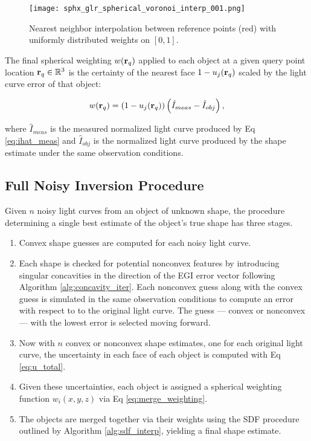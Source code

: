 \begin{figure}[!htb]
  \centering
  \texttt{[image: sphx\_glr\_spherical\_voronoi\_interp\_001.png]}
  \caption{Nearest neighbor interpolation between reference points (red) with uniformly distributed weights on $[0,1]$.}
  \label{fig:ball_tree_nn_interp}
\end{figure}

The final spherical weighting $w(\mathbf{r}_q)$ applied to each object at a given query point location $\mathbf{r}_q \in \mathbb{R}^3$ is the certainty of the nearest face $1-u_j(\mathbf{r}_q)$ scaled by the light curve error of that object:

\begin{equation} \label{eq:merge_weighting}
  w(\mathbf{r}_q) = \left( 1-u_j(\mathbf{r}_q) \right) \left( \hat{I}_{meas} - \hat{I}_{obj} \right),
\end{equation}

where $\hat{I}_{meas}$ is the measured normalized light curve produced by Eq \ref{eq:ihat_meas} and $\hat{I}_{obj}$ is the normalized light curve produced by the shape estimate under the same observation conditions.

\subsection{Full Noisy Inversion Procedure} \label{sec:mh_inversion}

Given $n$ noisy light curves from an object of unknown shape, the procedure determining a single best estimate of the object's true shape has three stages. 

\begin{enumerate}
  \item Convex shape guesses are computed for each noisy light curve.
  \item Each shape is checked for potential nonconvex features by introducing singular concavities in the direction of the EGI error vector following Algorithm \ref{alg:concavity_iter}. Each nonconvex guess along with the convex guess is simulated in the same observation conditions to compute an error with respect to to the original light curve. The guess --- convex or nonconvex --- with the lowest error is selected moving forward.
  \item Now with $n$ convex or nonconvex shape estimates, one for each original light curve, the uncertainty in each face of each object is computed with Eq \ref{eq:u_total}.
  \item Given these uncertainties, each object is assigned a spherical weighting function $w_i(x, y, z)$ via Eq \ref{eq:merge_weighting}.
  \item The objects are merged together via their weights using the SDF procedure outlined by Algorithm \ref{alg:sdf_interp}, yielding a final shape estimate.
\end{enumerate}

